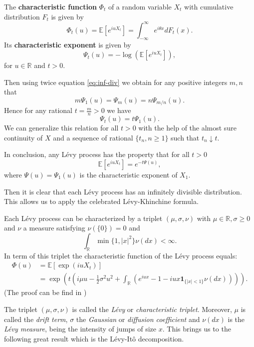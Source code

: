 \begin{defn}
The \textbf{characteristic function} $\Phi_t$ of a random variable $X_t$ with cumulative distribution $F_t$ is given by
$$\Phi_t(u) = \mathbb{E}\left[e^{iu X_t}\right]=\int_{-\infty}^{\infty}e^{i\theta x}dF_t(x).$$
Its \textbf{characteristic exponent} is given by
$$\Psi_t(u) = -\log\left(\mathbb{E}\left[e^{iu X_t}\right]\right),$$
for $u \in\mathbb{R}$ and $t>0$.
\end{defn}

 Then using twice equation \eqref{eq:inf-div} we obtain for any positive integers $m,n$ that
$$m\Psi_1(u) = \Psi_m(u) = n \Psi_{m/n}(u).$$
Hence for any rational $t=\frac{m}{n}>0$ we have
$$\Psi_t(u) = t\Psi_1(u).$$
We can generalize this relation for all $t>0$ with the help of the almost sure continuity of $X$ and a sequence of rational $\{t_n, n\geq 1\}$ such that $t_n\downarrow t$.

In conclusion, any L\'evy process has the property that for all $t>0$
$$\mathbb{E}\left[e^{iu X_t}\right] = e^{-t\Psi(u)},$$
where $\Psi(u) = \Psi_1(u)$ is the characteristic exponent of $X_1$.

Then it is clear that each L\'evy process has an infinitely divisible distribution. This allows us to apply the celebrated L\'evy-Khinchine formula. 

\begin{thm}
Each L\'evy process can be characterized by a triplet $(\mu,\sigma,\nu)$ with $\mu \in \mathbb{R},\sigma \geq 0$ and $\nu$ a measure satisfying $\nu(\{0\}) = 0$ and
$$\int_\mathbb{R} \min\{1,|x|^2\}\nu(dx)<\infty.$$
In term of this triplet the characteristic function of the L\'evy process equals:
\begin{align}\label{eq:LK}
\Phi(u) &= \mathbb{E}\left[\exp(i u X_t)\right]\nonumber\\
&= \exp\left(t\left(i\mu u -\frac{1}{2}\sigma^2u^2+\int_\mathbb{R}\left(e^{iux}-1-iux\mathbf{1}_{\{|x|<1\}}\nu(dx)\right)\right)\right).
\end{align}
(The proof can be find in \citeauthor{TC03} \citeyearpar{TC03})
\end{thm}

The triplet $(\mu,\sigma,\nu)$ is called the \textit{L\'evy} or \textit{characteristic triplet}. Moreover, $\mu$ is called the \textit{drift term}, $\sigma$ the \textit{Gaussian} or \textit{diffusion coefficient} and $\nu(dx)$ is the \textit{L\'evy measure}, being the intensity of jumps of size $x$. This brings us to the following great result which is the L\'evy-Itô decomposition.

